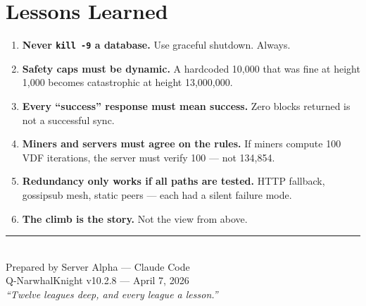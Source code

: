\documentclass[11pt,a4paper]{article}
\begin{document}
\section{Lessons Learned}

\begin{enumerate}[leftmargin=2em]
  \item \textbf{Never \texttt{kill -9} a database.} Use graceful shutdown. Always.
  \item \textbf{Safety caps must be dynamic.} A hardcoded 10,000 that was fine at height 1,000 becomes catastrophic at height 13,000,000.
  \item \textbf{Every ``success'' response must mean success.} Zero blocks returned is not a successful sync.
  \item \textbf{Miners and servers must agree on the rules.} If miners compute 100 VDF iterations, the server must verify 100 --- not 134,854.
  \item \textbf{Redundancy only works if all paths are tested.} HTTP fallback, gossipsub mesh, static peers --- each had a silent failure mode.
  \item \textbf{The climb is the story.} Not the view from above.
\end{enumerate}

\vfill

\begin{center}
\textcolor{rockgrey}{\rule{8cm}{0.4pt}}\\[0.5em]
\textcolor{rockgrey}{\small Prepared by Server Alpha --- Claude Code}\\
\textcolor{rockgrey}{\small Q-NarwhalKnight v10.2.8 --- April 7, 2026}\\[0.5em]
\textcolor{qnkgold}{\footnotesize \textit{``Twelve leagues deep, and every league a lesson.''}}
\end{center}
\end{document}
